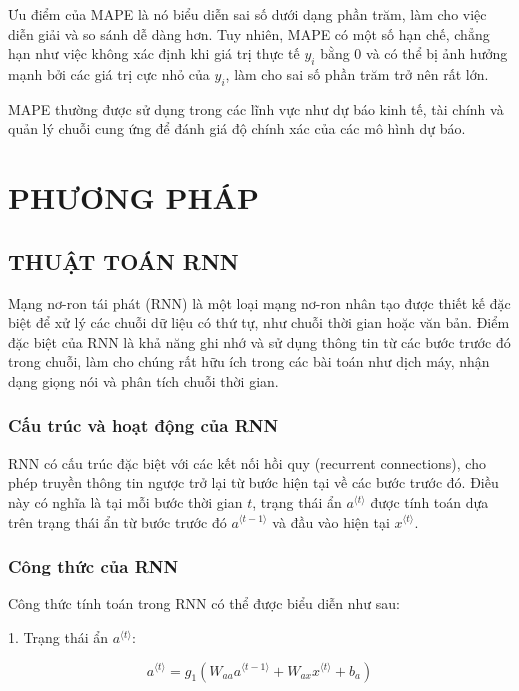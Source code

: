 \documentclass{article}
\begin{document}
\begin{multicols}{2}
Ưu điểm của MAPE là nó biểu diễn sai số dưới dạng phần trăm, làm cho việc diễn giải và so sánh dễ dàng hơn. Tuy nhiên, MAPE có một số hạn chế, chẳng hạn như việc không xác định khi giá trị thực tế $y_i$ bằng 0 và có thể bị ảnh hưởng mạnh bởi các giá trị cực nhỏ của $y_i$, làm cho sai số phần trăm trở nên rất lớn.

MAPE thường được sử dụng trong các lĩnh vực như dự báo kinh tế, tài chính và quản lý chuỗi cung ứng để đánh giá độ chính xác của các mô hình dự báo.
\section{PHƯƠNG PHÁP}

\subsection{THUẬT TOÁN RNN}

 Mạng nơ-ron tái phát (RNN) là một loại mạng nơ-ron nhân tạo được thiết kế đặc biệt để xử lý các chuỗi dữ liệu có thứ tự, như chuỗi thời gian hoặc văn bản. Điểm đặc biệt của RNN là khả năng ghi nhớ và sử dụng thông tin từ các bước trước đó trong chuỗi, làm cho chúng rất hữu ích trong các bài toán như dịch máy, nhận dạng giọng nói và phân tích chuỗi thời gian.

\subsubsection{Cấu trúc và hoạt động của RNN}

RNN có cấu trúc đặc biệt với các kết nối hồi quy (recurrent connections), cho phép truyền thông tin ngược trở lại từ bước hiện tại về các bước trước đó. Điều này có nghĩa là tại mỗi bước thời gian \(t\), trạng thái ẩn \(a^{\langle t \rangle}\) được tính toán dựa trên trạng thái ẩn từ bước trước đó \(a^{\langle t-1 \rangle}\) và đầu vào hiện tại \(x^{\langle t \rangle}\).

\subsubsection{Công thức của RNN}

Công thức tính toán trong RNN có thể được biểu diễn như sau:

1. Trạng thái ẩn \(a^{\langle t \rangle}\):

\[
a^{\langle t \rangle} = g_1 \left( W_{aa} a^{\langle t-1 \rangle} + W_{ax} x^{\langle t \rangle} + b_a \right)
\]


\end{multicols}
\end{document}
